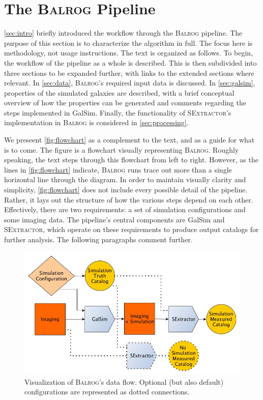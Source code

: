 \documentclass[12pt]{book}
\newcommand{\galsim}{GalSim}
\newcommand{\balrog}{\textsc{Balrog}}
\newcommand{\sex}{\textsc{SExtractor}}
\begin{document}
\chapter{The \balrog{} Pipeline}
\label{sec:algorithm}

\autoref{sec:intro} briefly introduced the workflow through the \balrog{} pipeline.
The purpose of this section is to characterize the algorithm in full.
The focus here is methodology, not usage instructions. 
The text is organized as follows.
To begin, the workflow of the pipeline as a whole is described.
This is then subdivided into three sections to be expanded further,
with links to the extended sections where relevant.
In \autoref{sec:data}, \balrog{}'s required input data is discussed.
In \autoref{sec:galsim}, properties of the simulated galaxies are described,
with a brief conceptual overview of how the properties can be generated
and comments regarding the steps implemented in \galsim{}.
Finally, the functionality of \sex{}'s implementation in \balrog{} is considered in \autoref{sec:processing}.

We preseent \autoref{fig:flowchart} as a complement to the text,
and as a guide for what is to come.
The figure is a flowchart visually representing \balrog{}.
Roughly speaking, the text steps through this flowchart from left to right.
However, as the lines in \autoref{fig:flowchart} indicate, \balrog{} runs trace out more than a single horizontal line through the diagram.
In order to maintain visually clarity and simplicity, \autoref{fig:flowchart} does not include every possible detail of the pipeline.
Rather, it lays out the structure of how the various steps depend on each other.
Effectively, there are two requirements: a set of simulation configurations and some imaging data.
The pipeline's central components are \galsim{} and \sex{}, which operate on these requirements
to produce output catalogs for further analysis.
The following paragraphs comment further.


\begin{figure}[h]
\includegraphics[width=0.9\linewidth]{flowchart.jpg}
\caption{Visualization of \balrog{}'s data flow. Optional (but also default) configurations are represented as dotted connections.}
\label{fig:flowchart}
\end{figure}
\end{document}
